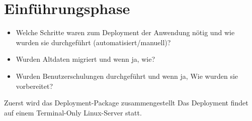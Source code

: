 \section{Einführungsphase}
\label{sec:Einfuehrungsphase}

\begin{itemize}
	\item Welche Schritte waren zum Deployment der Anwendung nötig und wie wurden sie durchgeführt (automatisiert/manuell)?
	\item Wurden \ggfs Altdaten migriert und wenn ja, wie?
	\item Wurden Benutzerschulungen durchgeführt und wenn ja, Wie wurden sie vorbereitet?
\end{itemize}


Zuerst wird das Deployment-Package zusammengestellt
Das Deployment findet auf einem Terminal-Only Linux-Server statt.
